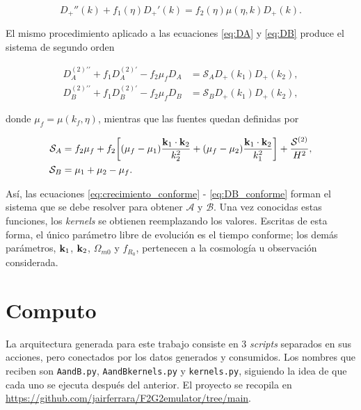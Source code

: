 \documentclass[letterpaper, 12pt]{article}
\begin{document}
        \begin{equation}
            D_+''(k) + f_1(\eta)D_+'(k) = f_2(\eta)\mu(\eta,k)D_+(k). \label{eq:crecimiento_conforme}
        \end{equation}
        
        El mismo procedimiento aplicado a las ecuaciones \ref{eq:DA} y \ref{eq:DB} produce el sistema de segundo orden
        
        \begin{align}
            D_A^{(2)\prime\prime} + f_1D_A^{(2)\prime} - f_2\mu_f D_A 
            &= \mathcal{S}_A D_+(k_1) D_+(k_2), \label{eq:DA_conforme}\\
            D_B^{(2)\prime\prime} + f_1 D_B^{(2)\prime} - f_2 \mu_f D_B 
            &= \mathcal{S}_B D_+(k_1) D_+(k_2), \label{eq:DB_conforme}
        \end{align}
        
        donde $\mu_f = \mu(k_f, \eta)$, mientras que las fuentes quedan definidas por
        
        \begin{align}
            \mathcal{S}_A 
            &= f_2\mu_f + f_2\qty[(\mu_f - \mu_1)\frac{\vb{k}_1 \cdot \vb{k}_2}{k_2^2} + (\mu_f - \mu_2)\frac{\vb{k}_1 \cdot \vb{k}_2}{k_1^2}] + \frac{\mathcal{S}^{(2)}}{H^2}, \\
            \mathcal{S}_B 
            &= \mu_1 + \mu_2 - \mu_f.
        \end{align}

        Así, las ecuaciones \ref{eq:crecimiento_conforme} - \ref{eq:DB_conforme} forman el sistema que se debe resolver para obtener $\mathcal{A}$ y $\mathcal{B}$. Una vez conocidas estas funciones, los \emph{kernels} se obtienen reemplazando los valores. Escritas de esta forma, el único parámetro libre de evolución es el tiempo conforme; los demás parámetros, $\vb{k}_1$, $\vb{k}_2$, $\Omega_{m0}$ y $f_{R_0}$, pertenecen a la cosmología u observación considerada.

    \section{Computo}
        La arquitectura generada para este trabajo consiste en 3 \emph{scripts} separados en sus acciones, pero conectados por los datos generados y consumidos. Los nombres que reciben son \texttt{AandB.py}, \texttt{AandBkernels.py} y \texttt{kernels.py}, siguiendo la idea de que cada uno se ejecuta después del anterior. El proyecto se recopila en \url{https://github.com/jairferrara/F2G2emulator/tree/main}.
        
\end{document}
